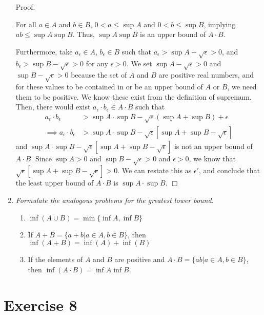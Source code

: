 \documentclass[
]{article}
\begin{document}
\begin{enumerate}
Proof.  

For all $a \in A$ and $b \in B$, $0 < a \leq \sup A$ and $0 < b \leq \sup B$, implying $ab \leq \sup A  \sup B$. Thus, $\sup A \sup B$ is an upper bound of $A \cdot B$.  

Furthermore, take $a_ \epsilon \in A$, $b_\epsilon \in B$ such that $a_\epsilon > \sup A - \sqrt{\epsilon} > 0$, and $b_\epsilon > \sup B - \sqrt{\epsilon} > 0$ for any $\epsilon > 0$. We set $\sup A - \sqrt{\epsilon} > 0$ and $\sup B - \sqrt{\epsilon} > 0$ because the set of $A$ and $B$ are positive real numbers, and for these values to be contained in or be an upper bound of $A$ or $B$, we need them to be positive. We know these exist from the definition of supremum. Then, there would exist $a_\epsilon \cdot b_\epsilon \in A \cdot B$ such that
\[\begin{aligned} a_\epsilon \cdot b_\epsilon &> \sup A \cdot \sup B - \sqrt{\epsilon}(\sup A + \sup B) + \epsilon \\ \implies a_\epsilon \cdot b_\epsilon &> \sup A \cdot \sup B - \sqrt{\epsilon}[\sup A + \sup B - \sqrt{\epsilon}] \end{aligned}\]
and $\sup A \cdot \sup B - \sqrt{\epsilon}[\sup A + \sup B - \sqrt{\epsilon}]$ is not an upper bound of $A \cdot B$. 
Since $\sup A > 0$ and $\sup B - \sqrt{\epsilon} > 0$ and $\epsilon > 0$, we know that $\sqrt{\epsilon}[\sup A + \sup B - \sqrt{\epsilon}] > 0$. We can restate this as $\epsilon '$, and conclude that the least upper bound of $A \cdot B$ is $\sup A \cdot \sup B$.  
\hfill $\Box$

\item \textit{Formulate the analogous problems for the greatest lower bound.}
\begin{enumerate} 
\item $\inf (A \cup B) = \min \{\inf A, \inf B\}$  
\item If $A+B = \{a + b | a \in A, b \in B\}$, then $\inf (A + B) = \inf (A) + \inf (B)$
\item If the elements of $A$ and $B$ are positive and $A \cdot B = \{ab | a \in A, b \in B\}$, then $\inf (A \cdot B) = \inf A \inf B$.
\end{enumerate}
\end{enumerate}

\hypertarget{exercise-8}{%
\section{Exercise 8}\label{exercise-8}}
\end{document}
